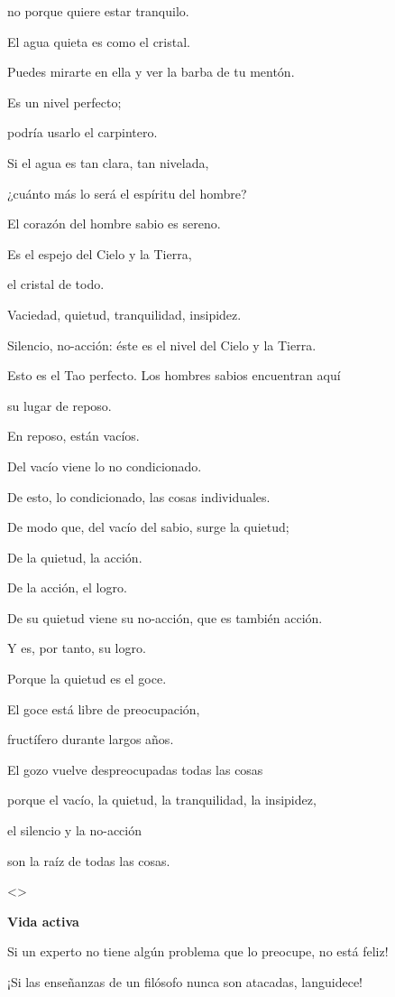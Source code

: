 no porque quiere estar tranquilo.

El agua quieta es como el cristal.

Puedes mirarte en ella y ver la barba de tu mentón.

Es un nivel perfecto;

podría usarlo el carpintero.

Si el agua es tan clara, tan nivelada,

¿cuánto más lo será el espíritu del hombre?

El corazón del hombre sabio es sereno.

Es el espejo del Cielo y la Tierra,

el cristal de todo.

Vaciedad, quietud, tranquilidad, insipidez.

Silencio, no-acción: éste es el nivel del Cielo y la Tierra.

Esto es el Tao perfecto. Los hombres sabios encuentran aquí

su lugar de reposo.

En reposo, están vacíos.

Del vacío viene lo no condicionado.

De esto, lo condicionado, las cosas individuales.

De modo que, del vacío del sabio, surge la quietud;

De la quietud, la acción.

De la acción, el logro.

De su quietud viene su no-acción, que es también acción.

Y es, por tanto, su logro.

Porque la quietud es el goce.

El goce está libre de preocupación,

fructífero durante largos años.

El gozo vuelve despreocupadas todas las cosas

porque el vacío, la quietud, la tranquilidad, la insipidez,

el silencio y la no-acción

son la raíz de todas las cosas.

\textless\textgreater{}

\textbf{{Vida activa}}

Si un experto no tiene algún problema que lo preocupe, no está feliz!

¡Si las enseñanzas de un filósofo nunca son atacadas, languidece!

